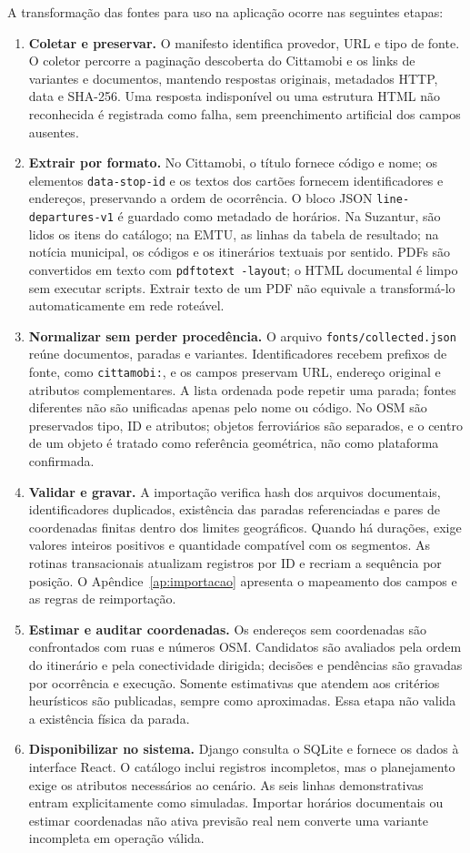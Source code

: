 \documentclass[12pt,oneside,a4paper,brazil]{abntex2}
\begin{document}
A transformação das fontes para uso na aplicação ocorre nas seguintes etapas:
\begin{enumerate}
\item \textbf{Coletar e preservar.} O manifesto identifica provedor, URL e tipo de fonte. O coletor percorre a paginação descoberta do Cittamobi e os links de variantes e documentos, mantendo respostas originais, metadados HTTP, data e SHA-256. Uma resposta indisponível ou uma estrutura HTML não reconhecida é registrada como falha, sem preenchimento artificial dos campos ausentes.
\item \textbf{Extrair por formato.} No Cittamobi, o título fornece código e nome; os elementos \texttt{data-stop-id} e os textos dos cartões fornecem identificadores e endereços, preservando a ordem de ocorrência. O bloco JSON \texttt{line-departures-v1} é guardado como metadado de horários. Na Suzantur, são lidos os itens do catálogo; na EMTU, as linhas da tabela de resultado; na notícia municipal, os códigos e os itinerários textuais por sentido. PDFs são convertidos em texto com \texttt{pdftotext -layout}; o HTML documental é limpo sem executar scripts. Extrair texto de um PDF não equivale a transformá-lo automaticamente em rede roteável.
\item \textbf{Normalizar sem perder procedência.} O arquivo \texttt{fonts/collected.json} reúne documentos, paradas e variantes. Identificadores recebem prefixos de fonte, como \texttt{cittamobi:}, e os campos preservam URL, endereço original e atributos complementares. A lista ordenada pode repetir uma parada; fontes diferentes não são unificadas apenas pelo nome ou código. No OSM são preservados tipo, ID e atributos; objetos ferroviários são separados, e o centro de um objeto é tratado como referência geométrica, não como plataforma confirmada.
\item \textbf{Validar e gravar.} A importação verifica hash dos arquivos documentais, identificadores duplicados, existência das paradas referenciadas e pares de coordenadas finitas dentro dos limites geográficos. Quando há durações, exige valores inteiros positivos e quantidade compatível com os segmentos. As rotinas transacionais atualizam registros por ID e recriam a sequência por posição. O Apêndice~\ref{ap:importacao} apresenta o mapeamento dos campos e as regras de reimportação.
\item \textbf{Estimar e auditar coordenadas.} Os endereços sem coordenadas são confrontados com ruas e números OSM. Candidatos são avaliados pela ordem do itinerário e pela conectividade dirigida; decisões e pendências são gravadas por ocorrência e execução. Somente estimativas que atendem aos critérios heurísticos são publicadas, sempre como aproximadas. Essa etapa não valida a existência física da parada.
\item \textbf{Disponibilizar no sistema.} Django consulta o SQLite e fornece os dados à interface React. O catálogo inclui registros incompletos, mas o planejamento exige os atributos necessários ao cenário. As seis linhas demonstrativas entram explicitamente como simuladas. Importar horários documentais ou estimar coordenadas não ativa previsão real nem converte uma variante incompleta em operação válida.
\end{enumerate}
\end{document}
